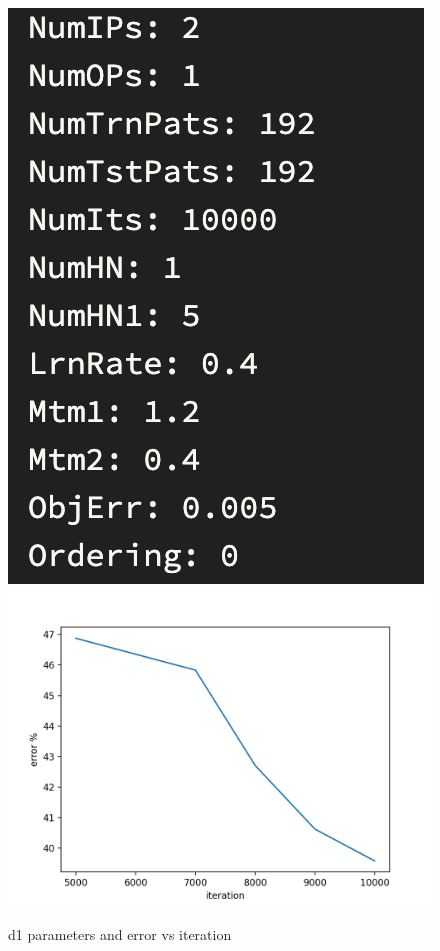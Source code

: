 \documentclass[11pt]{article}
\begin{document}
\begin{figure}[!ht]
    \centering
    \includegraphics[scale=0.8]{1-par.png}
    \includegraphics[scale=1]{Figure_1.png}
    \caption{d1 parameters and error vs iteration}
\end{figure}
\end{document}
